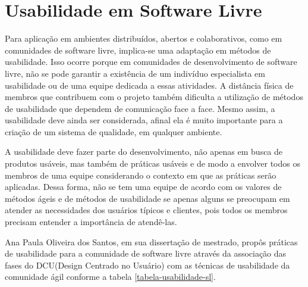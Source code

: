 \section{Usabilidade em Software Livre}
\label{usabilidade-sl}
%
Para aplicação em ambientes distribuídos, abertos e colaborativos, como em comunidades de software livre, implica-se uma adaptação em métodos de usabilidade. Isso ocorre porque em comunidades de desenvolvimento de software livre, não se pode garantir a existência de um indivíduo especialista em usabilidade ou de uma equipe dedicada a essas atividades. A distância física de membros que contribuem com o projeto também dificulta a utilização de métodos de usabilidade que dependem de comunicação face a face. Mesmo assim, a usabilidade deve ainda ser considerada, afinal ela é muito importante para a criação de um sistema de qualidade, em qualquer ambiente.

%
A usabilidade deve fazer parte do desenvolvimento, não apenas em busca de produtos usáveis, mas também de práticas usáveis e de modo a envolver todos os membros de uma equipe considerando o contexto em que as práticas serão aplicadas. Dessa forma, não se tem uma equipe de acordo com os valores de métodos ágeis e de métodos de usabilidade se apenas alguns se preocupam em atender as necessidades dos usuários típicos e clientes, pois todos os membros precisam entender a importância de atendê-las.
~\cite{santos2012}

%
Ana Paula Oliveira dos Santos, em sua dissertação de mestrado, propôs práticas de usabilidade para a comunidade de software livre através da associação das fases do DCU(Design Centrado no Usuário) com as técnicas de usabilidade da comunidade ágil conforme a tabela \ref{tabela-usabilidade-sl}.

